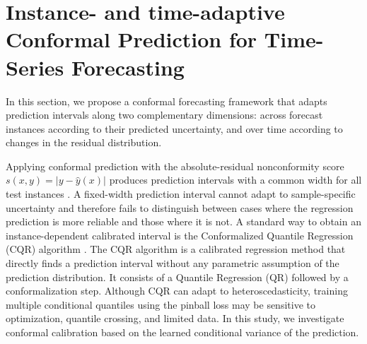 \section{Instance- and time-adaptive Conformal Prediction for Time-Series Forecasting}
In this section, we propose a conformal forecasting framework that adapts prediction intervals along two complementary dimensions:
across forecast instances according to their predicted uncertainty, and over time according to changes in the residual distribution.


Applying conformal prediction with the absolute-residual nonconformity score 
$s(x,y)=|y-\hat{y}(x)|$  produces prediction intervals with a common width for all test instances   \cite{kato2023review,zhou2025conformal}.  A fixed-width prediction interval cannot adapt to sample-specific uncertainty and therefore fails to distinguish between cases where the regression prediction is more reliable and those where it is not. A standard way to obtain an instance-dependent calibrated interval is the Conformalized Quantile Regression (CQR) algorithm \cite{cqr2019}.
The CQR algorithm is a calibrated regression method that directly finds a prediction interval without any parametric assumption of the prediction distribution.
It consists of a Quantile Regression (QR) \cite{koenker1978regression} followed by a conformalization step.
Although CQR can adapt to heteroscedasticity, training multiple conditional quantiles using the pinball loss may be sensitive to optimization, quantile crossing, and limited data. In this study, we investigate conformal calibration based on the learned conditional variance of the prediction.



